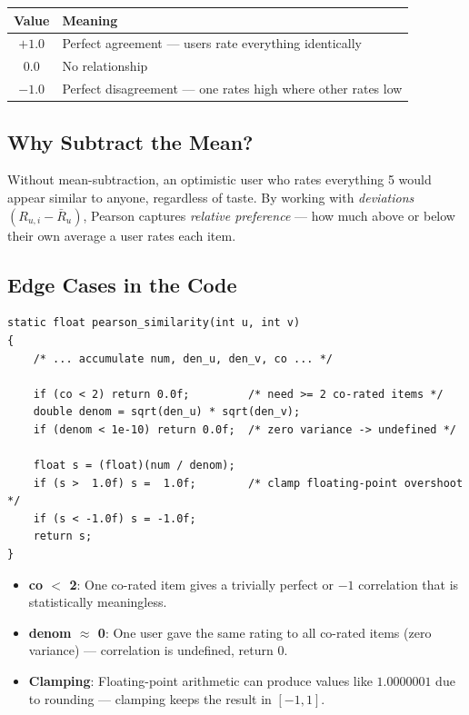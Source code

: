 \documentclass[12pt,a4paper]{article}
\begin{document}
\begin{center}
\begin{tabular}{cl}
\toprule
Value & Meaning \\
\midrule
$+1.0$ & Perfect agreement — users rate everything identically \\
$0.0$  & No relationship \\
$-1.0$ & Perfect disagreement — one rates high where other rates low \\
\bottomrule
\end{tabular}
\end{center}

\subsection{Why Subtract the Mean?}

Without mean-subtraction, an optimistic user who rates everything 5 would
appear similar to anyone, regardless of taste.  By working with
\emph{deviations} $(R_{u,i} - \bar{R}_u)$, Pearson captures \emph{relative
preference} — how much above or below their own average a user rates each item.

\subsection{Edge Cases in the Code}

\begin{lstlisting}
static float pearson_similarity(int u, int v)
{
    /* ... accumulate num, den_u, den_v, co ... */

    if (co < 2) return 0.0f;         /* need >= 2 co-rated items */
    double denom = sqrt(den_u) * sqrt(den_v);
    if (denom < 1e-10) return 0.0f;  /* zero variance -> undefined */

    float s = (float)(num / denom);
    if (s >  1.0f) s =  1.0f;        /* clamp floating-point overshoot */
    if (s < -1.0f) s = -1.0f;
    return s;
}
\end{lstlisting}

\begin{itemize}
    \item \textbf{co $<$ 2}: One co-rated item gives a trivially perfect or
          $-1$ correlation that is statistically meaningless.
    \item \textbf{denom $\approx$ 0}: One user gave the same rating to all
          co-rated items (zero variance) — correlation is undefined, return 0.
    \item \textbf{Clamping}: Floating-point arithmetic can produce values like
          $1.0000001$ due to rounding — clamping keeps the result in $[-1,1]$.
\end{itemize}
\end{document}
